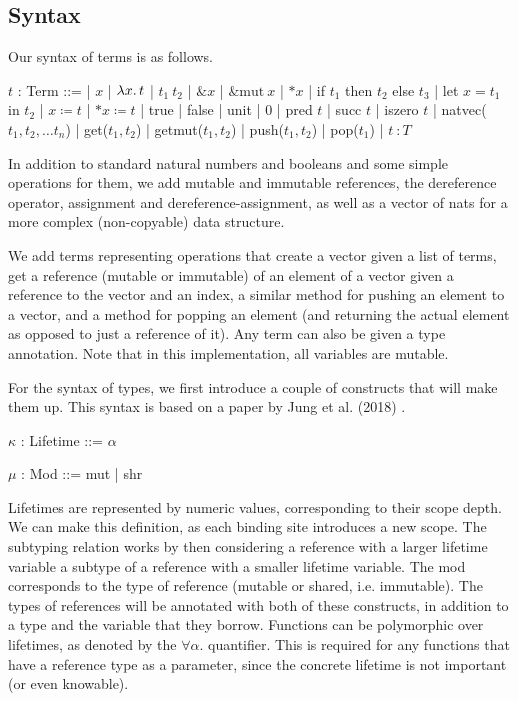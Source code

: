 \documentclass[letterpaper,11pt]{article}
\begin{document}
\subsection{Syntax}
Our syntax of terms is as follows.
\begin{center}
    \begin{bnf}
        $t$ : \textsf{Term} ::=
        | $x$ | $\lambda x\ldotp t$ | $t_1\ t_2$ | $\&x$ | $\&\text{mut}\ x$ | $*x$
        | if $t_1$ then $t_2$ else $t_3$
        | let $x = t_1$ in $t_2$
        | $x \coloneq t$
        | $*x \coloneq t$
        | true
        | false
        | unit
        | 0
        | pred $t$
        | succ $t$
        | iszero $t$
        | natvec($t_1,t_2,\dots t_n$)
        | get($t_1,t_2$)
        | getmut($t_1,t_2$)
        | push($t_1,t_2$)
        | pop($t_1$) 
        | $t\ \colon T$
    \end{bnf}
\end{center}
In addition to standard natural numbers and booleans and some simple operations for them, we add
mutable and immutable references, the dereference operator, assignment and
dereference-assignment, as well as a vector of nats for a more complex
(non-copyable) data structure. 

We add terms representing operations that create a vector given a list of terms, 
get a reference (mutable or immutable) of an element of a vector given a reference to the vector and an index, 
a similar method for pushing an element to a vector, and a method for popping an element
(and returning the actual element as opposed to just a reference of it). Any term can also be given a type annotation.
Note that in this implementation, all variables are mutable.

For the syntax of types, we first introduce a couple of constructs that will make
them up. This syntax is based on a paper by Jung et al. (2018) \cite{rustbelt1}.
\begin{center}
    \begin{bnf}
        $\kappa$ : \textsf{Lifetime} ::= $\alpha$
    \end{bnf}

    \begin{bnf}
        $\mu$ : \textsf{Mod} ::= mut | shr
    \end{bnf}
\end{center}
Lifetimes are represented by numeric values, corresponding to their scope depth.
We can make this definition, as each binding site introduces a new scope. The
subtyping relation works by then considering a reference with a larger lifetime variable a subtype
of a reference with a smaller lifetime variable. The mod corresponds to the type
of reference (mutable or shared, i.e. immutable). The types of references will be
annotated with both of these constructs, in addition to a type and the variable that they borrow.
Functions can be polymorphic over lifetimes, as denoted by the $\forall \alpha.$ quantifier. This is required for any functions
that have a reference type as a parameter, since the concrete lifetime is not important (or even knowable).
\end{document}
